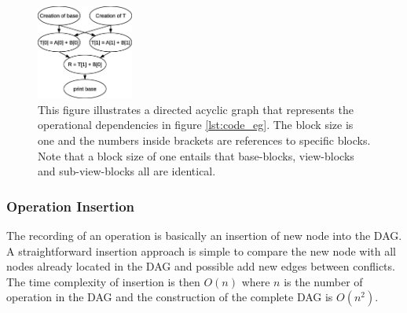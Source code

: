 \documentclass[preprint]{../PGAS10/sigplanconf}
\begin{document}
\begin{figure}
 \centering
 \includegraphics[width=120px]{gfx/dag}
 \caption{This figure illustrates a directed acyclic graph that represents the operational dependencies in figure \ref{lst:code_eg}. The block size is one and the numbers inside brackets are references to specific blocks. Note that a block size of one entails that base-blocks, view-blocks and sub-view-blocks all are identical.}
 \label{fig:DAG}
\end{figure}


\subsubsection{Operation Insertion}
The recording of an operation is basically an insertion of new node into the DAG. A straightforward insertion approach is simple to compare the new node with all nodes already located in the DAG and possible add new edges between conflicts. The time complexity of insertion is then $O(n)$ where $n$ is the number of operation in the DAG and the construction of the complete DAG is $O(n^2)$.

\end{document}
